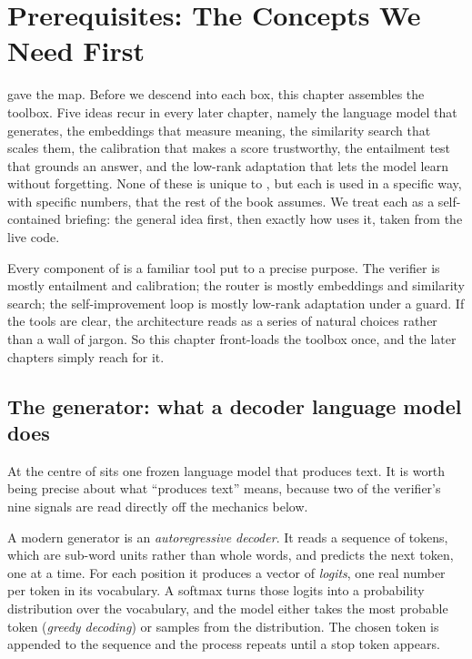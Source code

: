 \chapter{Prerequisites: The Concepts We Need First}
\label{ch:prereq}

 gave the map. Before we descend into each box, this chapter
assembles the toolbox. Five ideas recur in every later chapter, namely the
language model that generates, the embeddings that measure meaning, the
similarity search that scales them, the calibration that makes a score
trustworthy, the entailment test that grounds an answer, and the low-rank
adaptation that lets the model learn without forgetting. None of these is unique
to \caem{}, but each is used in a specific way, with specific numbers, that the
rest of the book assumes. We treat each as a self-contained briefing: the general
idea first, then exactly how \caem{} uses it, taken from the live code.

\begin{intuition}
Every component of \caem{} is a familiar tool put to a precise purpose. The
verifier is mostly entailment and calibration; the router is mostly embeddings and
similarity search; the self-improvement loop is mostly low-rank adaptation under a
guard. If the tools are clear, the architecture reads as a series of natural
choices rather than a wall of jargon. So this chapter front-loads the toolbox
once, and the later chapters simply reach for it.
\end{intuition}

\section{The generator: what a decoder language model does}
\label{sec:prereq-llm}

At the centre of \caem{} sits one frozen language model that produces text. It is
worth being precise about what ``produces text'' means, because two of the
verifier's nine signals are read directly off the mechanics below.

A modern generator is an \emph{autoregressive decoder}. It reads a sequence of
tokens, which are sub-word units rather than whole words, and predicts the next
token, one at a time. For each position it produces a vector of \emph{logits},
one real number per token in its vocabulary. A softmax turns those logits into a
probability distribution over the vocabulary, and the model either takes the most
probable token (\emph{greedy decoding}) or samples from the distribution. The
chosen token is appended to the sequence and the process repeats until a stop
token appears.

